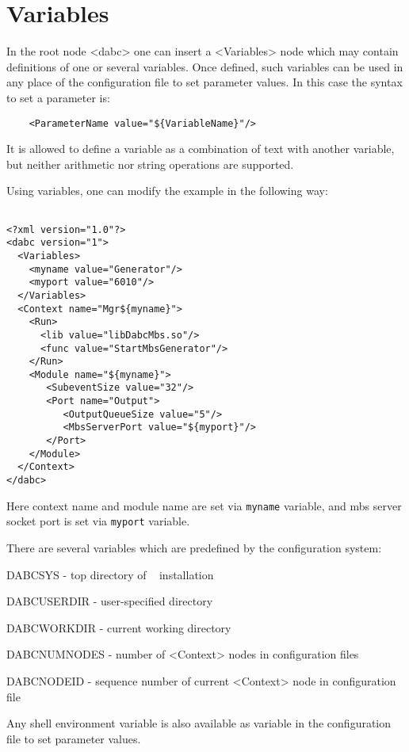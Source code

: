 \section{Variables}
\label{prog_setup_configfile_variables}
In the root node <dabc> one can insert a <Variables> node which may contain 
definitions of one or several variables. Once defined, 
such variables can be used in any place of the configuration file to set parameter values.
In this case the syntax to set a parameter is:

\begin{verbatim}
    <ParameterName value="${VariableName}"/>
\end{verbatim}

It is allowed to define a variable as a combination of text with another variable, 
but neither arithmetic nor string operations are supported. 

Using variables, one can modify the example in the following way:

\begin{verbatim}

<?xml version="1.0"?>
<dabc version="1">
  <Variables>
    <myname value="Generator"/> 
    <myport value="6010"/> 
  </Variables>
  <Context name="Mgr${myname}">
    <Run>
      <lib value="libDabcMbs.so"/>
      <func value="StartMbsGenerator"/>
    </Run>
    <Module name="${myname}">
       <SubeventSize value="32"/>
       <Port name="Output">
          <OutputQueueSize value="5"/>
          <MbsServerPort value="${myport}"/>
       </Port>
    </Module>
  </Context>
</dabc>

\end{verbatim}

Here context name and module name are set via {\tt myname} variable,
and mbs server socket port is set via {\tt myport} variable.

There are several variables which are predefined by the configuration system:

\bbul
\item DABCSYS - top directory of \dabc~ installation
\item DABCUSERDIR - user-specified directory
\item DABCWORKDIR - current working directory
\item DABCNUMNODES - number of <Context> nodes in configuration files
\item DABCNODEID - sequence number of current <Context> node in configuration file 
\ebul

Any shell environment variable 
is also available as variable in the configuration file to set parameter values. 



